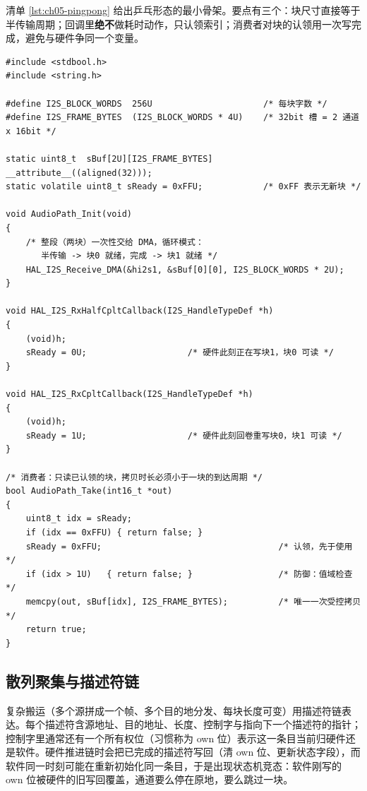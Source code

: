 \documentclass[12pt,a4paper,fontset=fandol]{ctexbook}
\begin{document}
清单 \ref{lst:ch05-pingpong} 给出乒乓形态的最小骨架。要点有三个：块尺寸直接等于半传输周期；回调里\textbf{绝不}做耗时动作，只认领索引；消费者对块的认领用一次写完成，避免与硬件争同一个变量。

\begin{lstlisting}[style=cstyle,caption={C：I2S 连续接收的乒乓双缓冲与半传输回调},label={lst:ch05-pingpong}]
#include <stdbool.h>
#include <string.h>

#define I2S_BLOCK_WORDS  256U                      /* 每块字数 */
#define I2S_FRAME_BYTES  (I2S_BLOCK_WORDS * 4U)    /* 32bit 槽 = 2 通道 x 16bit */

static uint8_t  sBuf[2U][I2S_FRAME_BYTES] __attribute__((aligned(32)));
static volatile uint8_t sReady = 0xFFU;            /* 0xFF 表示无新块 */

void AudioPath_Init(void)
{
    /* 整段（两块）一次性交给 DMA，循环模式：
       半传输 -> 块0 就绪，完成 -> 块1 就绪 */
    HAL_I2S_Receive_DMA(&hi2s1, &sBuf[0][0], I2S_BLOCK_WORDS * 2U);
}

void HAL_I2S_RxHalfCpltCallback(I2S_HandleTypeDef *h)
{
    (void)h;
    sReady = 0U;                    /* 硬件此刻正在写块1，块0 可读 */
}

void HAL_I2S_RxCpltCallback(I2S_HandleTypeDef *h)
{
    (void)h;
    sReady = 1U;                    /* 硬件此刻回卷重写块0，块1 可读 */
}

/* 消费者：只读已认领的块，拷贝时长必须小于一块的到达周期 */
bool AudioPath_Take(int16_t *out)
{
    uint8_t idx = sReady;
    if (idx == 0xFFU) { return false; }
    sReady = 0xFFU;                                   /* 认领，先于使用 */
    if (idx > 1U)   { return false; }                 /* 防御：值域检查 */
    memcpy(out, sBuf[idx], I2S_FRAME_BYTES);          /* 唯一一次受控拷贝 */
    return true;
}
\end{lstlisting}

\subsection{散列聚集与描述符链}

复杂搬运（多个源拼成一个帧、多个目的地分发、每块长度可变）用描述符链表达。每个描述符含源地址、目的地址、长度、控制字与指向下一个描述符的指针；控制字里通常还有一个所有权位（习惯称为 own 位）表示这一条目当前归硬件还是软件。硬件推进链时会把已完成的描述符写回（清 own 位、更新状态字段），而软件同一时刻可能在重新初始化同一条目，于是出现状态机竞态：软件刚写的 own 位被硬件的旧写回覆盖，通道要么停在原地，要么跳过一块。
\end{document}
